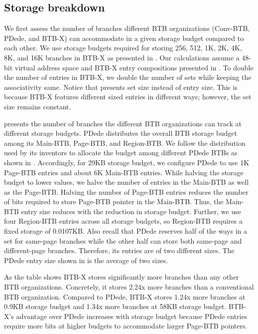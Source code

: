 \subsection{Storage breakdown}
\label{hpca:sec:storageBreak}

We first assess the number of branches different BTB organizations (Conv-BTB, PDede, and BTB-X) can accommodate in a given storage budget compared to each other. We use storage budgets required for storing 256, 512, 1K, 2K, 4K, 8K, and 16K branches in BTB-X as presented in . Our calculations assume a 48-bit virtual address space and BTB-X entry compositions presented in . To double the number of entries in BTB-X, we double the number of sets while keeping the associativity same. Notice that  presents set size instead of entry size. This is because BTB-X features different sized entries in different ways; however, the set size remains constant.

 presents the number of branches the different BTB organizations can track at different storage budgets. PDede distributes the overall BTB storage budget among its Main-BTB, Page-BTB, and Region-BTB. We follow the distribution used by its inventors\cite{pdede} to allocate the budget among different PDede BTBs as shown in . Accordingly, for 29KB storage budget, we configure PDede to use 1K Page-BTB entries and about 6K Main-BTB entries. While halving the storage budget to lower values, we halve the number of entries in the Main-BTB as well as the Page-BTB. Halving the number of Page-BTB entries reduces the number of bits required to store Page-BTB pointer in the Main-BTB. Thus, the Main-BTB entry size reduces with the reduction in storage budget. Further, we use four Region-BTB entries across all storage budgets, so Region-BTB requires a fixed storage of 0.0107KB. Also recall that PDede reserves half of the ways in a set for same-page branches while the other half can store both same-page and different-page branches. Therefore, its entries are of two different sizes. The PDede entry size shown in  is the average of two sizes.


As the table shows BTB-X stores significantly more branches than any other BTB organizations. Concretely, it stores 2.24x more branches than a conventional BTB organization. Compared to PDede, BTB-X stores 1.24x more branches at 0.9KB storage budget and 1.34x more branches at 58KB storage budget. BTB-X's advantage over PDede increases with storage budget because PDede entries require more bits at higher budgets to accommodate larger Page-BTB pointers.


